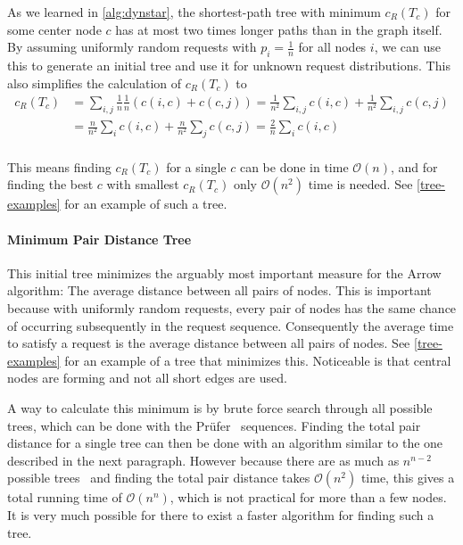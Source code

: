 \documentclass[a4paper, oneside]{discothesis}
\begin{document}
As we learned in \autoref{alg:dynstar}, the shortest-path tree with minimum $c_R(T_c)$ for some center node $c$ has at most two times longer paths than in the graph itself. By assuming uniformly random requests with $p_i=\frac{1}{n}$ for all nodes $i$, we can use this to generate an initial tree and use it for unknown request distributions. This also simplifies the calculation of $c_R(T_c)$ to
\begin{equation}
\begin{split}
c_R(T_c)&=\sum_{i,j}\frac{1}{n}\frac{1}{n}(c(i,c)+c(c,j))=\frac{1}{n^2}\sum_{i,j}c(i,c)+\frac{1}{n^2}\sum_{i,j}c(c,j) \\
&=\frac{n}{n^2}\sum_{i}c(i,c)+\frac{n}{n^2}\sum_{j}c(c,j)=\frac{2}{n}\sum_{i}c(i,c) \\
\end{split}
\end{equation}

This means finding $c_R(T_c)$ for a single $c$ can be done in time $\mathcal{O}(n)$, and for finding the best $c$ with smallest $c_R(T_c)$ only $\mathcal{O}(n^2)$ time is needed. See \autoref{tree-examples} for an example of such a tree.

\paragraph{Minimum Pair Distance Tree}\label{tree:mpd}

This initial tree minimizes the arguably most important measure for the Arrow algorithm: The average distance between all pairs of nodes. This is important because with uniformly random requests, every pair of nodes has the same chance of occurring subsequently in the request sequence. Consequently the average time to satisfy a request is the average distance between all pairs of nodes. See \autoref{tree-examples} for an example of a tree that minimizes this. Noticeable is that central nodes are forming and not all short edges are used.

A way to calculate this minimum is by brute force search through all possible trees, which can be done with the Prüfer~\cite{Prufer} sequences. Finding the total pair distance for a single tree can then be done with an algorithm similar to the one described in the next paragraph. However because there are as much as $n^{n-2}$ possible trees~\cite{Borchardt} and finding the total pair distance takes $\mathcal{O}(n^2)$ time, this gives a total running time of $\mathcal{O}(n^n)$, which is not practical for more than a few nodes. It is very much possible for there to exist a faster algorithm for finding such a tree.
\end{document}
